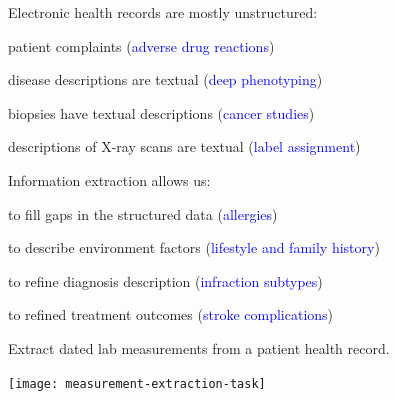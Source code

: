 \documentclass[landscape,footrule]{foils}
\begin{document}
\titlefoil


Electronic health records are mostly unstructured:
\begin{diamonds}
 \item patient complaints (\textcolor{blue}{adverse drug reactions})
 \item disease descriptions are textual (\textcolor{blue}{deep phenotyping})
 \item biopsies have textual descriptions (\textcolor{blue}{cancer studies})
 \item descriptions of X-ray scans are textual (\textcolor{blue}{label assignment})\vspace*{3ex}
\end{diamonds}\vspace{1cm}

Information extraction allows us: 
\begin{diamonds}
\item to fill gaps in the structured data (\textcolor{blue}{allergies})
\item to describe environment factors (\textcolor{blue}{lifestyle and family history})
\item to refine diagnosis description (\textcolor{blue}{infraction subtypes}) 
\item to refined treatment outcomes (\textcolor{blue}{stroke complications}) 
\end{diamonds}



Extract dated lab measurements from a patient health record.\vspace*{1cm}


\centerline{\texttt{[image: measurement-extraction-task]}}


\end{document}
